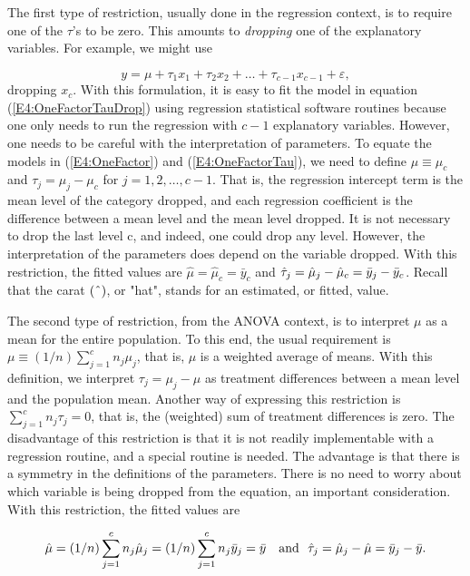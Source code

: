The first type of restriction, usually done in the regression context, is to
require one of the $\tau $'s to be zero. This amounts to \textit{dropping}
one of the explanatory variables. For example, we might use

\begin{equation}  \label{E4:OneFactorTauDrop}
y=\mu +\tau _{1}x_{1}+\tau _{2}x_{2}+\ldots +\tau
_{c-1}x_{c-1}+\varepsilon,
\end{equation}%
dropping $x_{c}$. With this formulation, it is easy to fit the model
in equation (\ref{E4:OneFactorTauDrop}) using regression statistical
software routines because one only needs to run the regression with
$c-1$ explanatory variables. However, one needs to be careful with
the interpretation of parameters. To equate the models in
(\ref{E4:OneFactor}) and (\ref{E4:OneFactorTau}), we need to define
$\mu \equiv \mu _{c}$ and $\tau _{j}=\mu _{j}-\mu _{c}$ for
$j=1,2,\ldots ,c-1$. That is, the regression intercept term is the
mean level of the category dropped, and each regression coefficient
is the difference between a mean level and the mean level dropped.
It is not necessary to drop the last level c, and indeed, one could
drop any level. However, the interpretation of the parameters does
depend on the variable dropped. With this restriction, the fitted
values are
$\hat{\mu}=\hat{\mu}_{c}=\bar{y}_{c}$ and $\hat{\tau}_{j}=\hat{\mu}_{j}-\hat{%
\mu}_{c}=\bar{y}_{j}-\bar{y}_{c}$. Recall that the carat $(\symbol{94})$, or
"hat", stands for an estimated, or fitted, value.

The second type of restriction, from the ANOVA context, is to interpret $\mu
$ as a mean for the entire population. To this end, the usual requirement is
$\mu \equiv (1/n)\sum_{j=1}^{c}n_{j}\mu _{j}$, that is, $\mu $ is a weighted
average of means. With this definition, we interpret $\tau _{j}=\mu _{j}-\mu
$ as treatment differences between a mean level and the population mean.
Another way of expressing this restriction is $\sum_{j=1}^{c}n_{j}\tau
_{j}=0 $, that is, the (weighted) sum of treatment differences is zero. The
disadvantage of this restriction is that it is not readily implementable
with a regression routine, and a special routine is needed. The advantage is
that there is a symmetry in the definitions of the parameters. There is no
need to worry about which variable is being dropped from the equation, an
important consideration. With this restriction, the fitted values are

\begin{equation*}
\hat{\mu}=(1/n)\sum_{j=1}^{c}n_{j}\hat{\mu}_{j}=(1/n)\sum_{j=1}^{c}n_{j}\bar{%
y}_{j}=\bar{y}\text{ \ \ and \ }\hat{\tau}_{j}=\hat{\mu}_{j}-\hat{\mu}=\bar{y%
}_{j}-\bar{y}.
\end{equation*}

